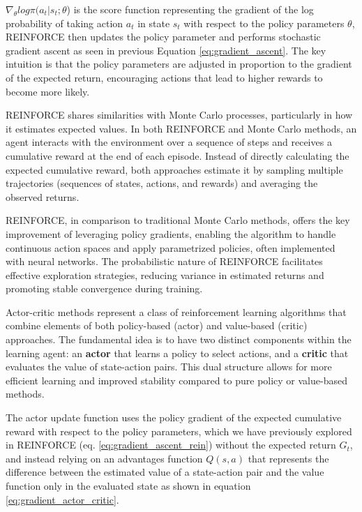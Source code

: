 $\nabla_\theta log \pi(a_t|s_t;\theta$) is the score function representing the gradient of the log probability of taking action $a_t$ in state $s_t$ with respect to the policy parameters $\theta$, REINFORCE then updates the policy parameter and performs stochastic gradient ascent as seen in previous Equation \ref{eq:gradient_ascent}. The key intuition is that the policy parameters are adjusted in proportion to the gradient of the expected return, encouraging actions that lead to higher rewards to become more likely.

REINFORCE shares similarities with Monte Carlo processes, particularly in how it estimates expected values. In both REINFORCE and Monte Carlo methods, an agent interacts with the environment over a sequence of steps and receives a cumulative reward at the end of each episode. Instead of directly calculating the expected cumulative reward, both approaches estimate it by sampling multiple trajectories (sequences of states, actions, and rewards) and averaging the observed returns.

REINFORCE, in comparison to traditional Monte Carlo methods, offers the key improvement of leveraging policy gradients, enabling the algorithm to handle continuous action spaces and apply parametrized policies, often implemented with neural networks. The probabilistic nature of REINFORCE facilitates effective exploration strategies, reducing variance in estimated returns and promoting stable convergence during training.

Actor-critic methods represent a class of reinforcement learning algorithms that combine elements of both policy-based (actor) and value-based (critic) approaches. The fundamental idea is to have two distinct components within the learning agent: an \textbf{actor} that learns a policy to select actions, and a \textbf{critic} that evaluates the value of state-action pairs. This dual structure allows for more efficient learning and improved stability compared to pure policy or value-based methods.

The actor update function uses the policy gradient of the expected cumulative reward with respect to the policy parameters, which we have previously explored in REINFORCE (eq. \ref{eq:gradient_ascent_rein}) without the expected return $G_t$, and instead relying on an advantages function $Q(s,a)$ that represents the difference between the estimated value of a state-action pair and the value function only in the evaluated state as shown in equation \ref{eq:gradient_actor_critic}. 

